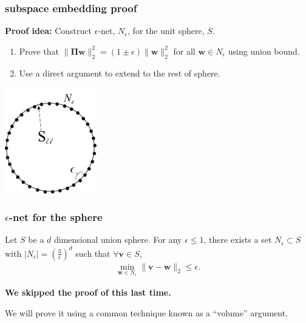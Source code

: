 \documentclass[compress]{beamer}
\newcommand{\bs}[1]{\boldsymbol{#1}}
\newcommand{\bv}[1]{\mathbf{#1}}
\begin{document}
	
	\begin{frame}
		\frametitle{subspace embedding proof}
		\textbf{Proof idea:} Construct $\epsilon$-net, $N_\epsilon$, for the unit sphere, ${S}$. 
		\begin{enumerate}
			\item Prove that $\|\bs{\Pi}\bv{w}\|_2^2 = (1\pm \epsilon)\|\bv{w}\|_2^2$ for all $\bv{w}\in N_\epsilon$ using union bound.
			\item Use a direct argument to extend to the rest of sphere. 
		\end{enumerate}
		\vspace{-1em}
		\begin{center}
			\includegraphics[width=0.3\textwidth]{2dnet.png}
		\end{center}
	\end{frame}
	
	\begin{frame}[t]
		\frametitle{$\epsilon$-net for the sphere}
		\begin{lemma}
			Let ${S}$ be a $d$ dimensional union sphere.
			For any $\epsilon \leq 1$, there exists a set $N_{\epsilon} \subset S$ with $| N_\epsilon | = \left(\frac{3}{\epsilon}\right)^d$ such that $\forall \bv{v} \in S$,
			\begin{align*}
				\min_{\bv{w} \in N_\epsilon} \|\bv{v} - \bv{w}\|_2 \leq \epsilon. 
			\end{align*}
		\end{lemma} 
	\begin{center}
		\textbf{We skipped the proof of this last time.}

		We will prove it using a common technique known as a ``volume'' argument.
	\end{center}
	\end{frame}
\end{document}
